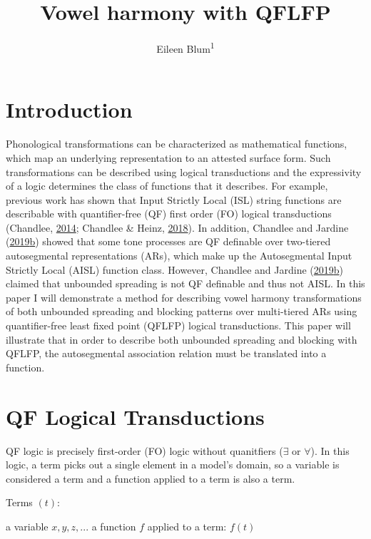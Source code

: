 \documentclass[,doc,floatsintext]{apa6}
\title{Vowel harmony with QFLFP}
\author{Eileen Blum\textsuperscript{1}}
\date{}
\affiliation{
\vspace{0.5cm}
\textsuperscript{1} Rutgers University}
\theoremstyle{definition}
\theoremstyle{definition}
\theoremstyle{definition}
\theoremstyle{remark}
\begin{document}
\maketitle

\section{Introduction}\label{introduction}

Phonological transformations can be characterized as mathematical
functions, which map an underlying representation to an attested surface
form. Such transformations can be described using logical transductions
and the expressivity of a logic determines the class of functions that
it describes. For example, previous work has shown that Input Strictly
Local (ISL) string functions are describable with quantifier-free (QF)
first order (FO) logical transductions (Chandlee,
\protect\hyperlink{ref-chandlee2014}{2014}; Chandlee \& Heinz,
\protect\hyperlink{ref-chandleeheinz2018}{2018}). In addition, Chandlee
and Jardine
(\protect\hyperlink{ref-chandleejardine2019}{2019}\protect\hyperlink{ref-chandleejardine2019}{b})
showed that some tone processes are QF definable over two-tiered
autosegmental representations (ARs), which make up the Autosegmental
Input Strictly Local (AISL) function class. However, Chandlee and
Jardine
(\protect\hyperlink{ref-chandleejardine2019}{2019}\protect\hyperlink{ref-chandleejardine2019}{b})
claimed that unbounded spreading is not QF definable and thus not AISL.
In this paper I will demonstrate a method for describing vowel harmony
transformations of both unbounded spreading and blocking patterns over
multi-tiered ARs using quantifier-free least fixed point (QFLFP) logical
transductions. This paper will illustrate that in order to describe both
unbounded spreading and blocking with QFLFP, the autosegmental
association relation must be translated into a function.

\section{QF Logical Transductions}\label{qf-logical-transductions}

QF logic is precisely first-order (FO) logic without quanitfiers
(\(\exists\) or \(\forall\)). In this logic, a term picks out a single
element in a model's domain, so a variable is considered a term and a
function applied to a term is also a term.

\begin{exe}
\ex Terms $(t)$: \label{terms}
  \begin{xlist}
  \ex a variable $x, y, z, ...$
  \ex a function $f$ applied to a term: $f(t)$
  \end{xlist}
\end{exe}
\end{document}
